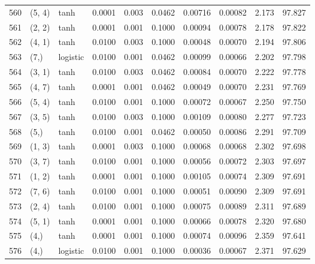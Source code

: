 \begin{tabular}{lllrrrrrrr}
560 &      (5, 4) &      tanh &  0.0001 &  0.003 &  0.0462 &          0.00716 &    0.00082 &       2.173 &    97.827 \\
561 &      (2, 2) &      tanh &  0.0001 &  0.001 &  0.1000 &          0.00094 &    0.00078 &       2.178 &    97.822 \\
562 &      (4, 1) &      tanh &  0.0100 &  0.003 &  0.1000 &          0.00048 &    0.00070 &       2.194 &    97.806 \\
563 &        (7,) &  logistic &  0.0100 &  0.001 &  0.0462 &          0.00099 &    0.00066 &       2.202 &    97.798 \\
564 &      (3, 1) &      tanh &  0.0100 &  0.003 &  0.0462 &          0.00084 &    0.00070 &       2.222 &    97.778 \\
565 &      (4, 7) &      tanh &  0.0001 &  0.001 &  0.0462 &          0.00049 &    0.00070 &       2.231 &    97.769 \\
566 &      (5, 4) &      tanh &  0.0100 &  0.001 &  0.1000 &          0.00072 &    0.00067 &       2.250 &    97.750 \\
567 &      (3, 5) &      tanh &  0.0100 &  0.003 &  0.1000 &          0.00109 &    0.00080 &       2.277 &    97.723 \\
568 &        (5,) &      tanh &  0.0100 &  0.001 &  0.0462 &          0.00050 &    0.00086 &       2.291 &    97.709 \\
569 &      (1, 3) &      tanh &  0.0001 &  0.003 &  0.1000 &          0.00068 &    0.00068 &       2.302 &    97.698 \\
570 &      (3, 7) &      tanh &  0.0100 &  0.001 &  0.1000 &          0.00056 &    0.00072 &       2.303 &    97.697 \\
571 &      (1, 2) &      tanh &  0.0001 &  0.001 &  0.1000 &          0.00105 &    0.00074 &       2.309 &    97.691 \\
572 &      (7, 6) &      tanh &  0.0100 &  0.001 &  0.1000 &          0.00051 &    0.00090 &       2.309 &    97.691 \\
573 &      (2, 4) &      tanh &  0.0100 &  0.001 &  0.1000 &          0.00075 &    0.00089 &       2.311 &    97.689 \\
574 &      (5, 1) &      tanh &  0.0001 &  0.001 &  0.1000 &          0.00066 &    0.00078 &       2.320 &    97.680 \\
575 &        (4,) &      tanh &  0.0001 &  0.001 &  0.1000 &          0.00074 &    0.00096 &       2.359 &    97.641 \\
576 &        (4,) &  logistic &  0.0100 &  0.001 &  0.1000 &          0.00036 &    0.00067 &       2.371 &    97.629 \\

\end{tabular}
